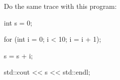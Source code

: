 Do the same trace with this program:

\begin{console}

int s = 0;

for (int i = 0; i < 10; i = i + 1);

    s = s + i;

std::cout << s << std::endl;

\end{console}

